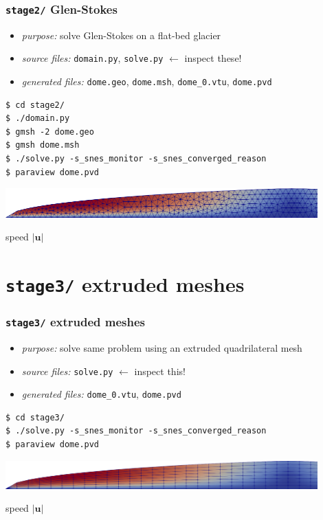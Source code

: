 \documentclass[10pt,
               hyperref={colorlinks,citecolor=DeepPink4,linkcolor=black,urlcolor=blue},
               svgnames]{beamer}
\newcommand{\bu}{\mathbf{u}}
\begin{document}
\begin{frame}[fragile]
\frametitle{\texttt{stage2/} \qquad Glen-Stokes}

\begin{itemize}
\item \emph{purpose:} solve Glen-Stokes on a flat-bed glacier
\item \emph{source files:} \texttt{domain.py}, \texttt{solve.py} \hfill \alert{$\gets$ inspect these!}
\item \emph{generated files:} \texttt{dome.geo}, \texttt{dome.msh}, \texttt{dome\_0.vtu}, \texttt{dome.pvd}
\end{itemize}

\bigskip
\begin{Verbatim}
$ cd stage2/
$ ./domain.py
$ gmsh -2 dome.geo
$ gmsh dome.msh
$ ./solve.py -s_snes_monitor -s_snes_converged_reason
$ paraview dome.pvd
\end{Verbatim}

\vspace{10mm}
\begin{center}
\includegraphics[width=0.9\textwidth]{figs/stage2.png}

{\tiny speed $|\bu|$}
\end{center}
\end{frame}


\section{\texttt{stage3/} \qquad extruded meshes}

\begin{frame}[fragile]
\frametitle{\texttt{stage3/} \qquad extruded meshes}

\begin{itemize}
\item \emph{purpose:} solve same problem using an extruded quadrilateral mesh
\item \emph{source files:} \texttt{solve.py} \hfill \alert{$\gets$ inspect this!}
\item \emph{generated files:} \texttt{dome\_0.vtu}, \texttt{dome.pvd}
\end{itemize}

\bigskip
\begin{Verbatim}
$ cd stage3/
$ ./solve.py -s_snes_monitor -s_snes_converged_reason
$ paraview dome.pvd
\end{Verbatim}

\vspace{10mm}
\begin{center}
\includegraphics[width=0.9\textwidth]{figs/stage3.png}

{\tiny speed $|\bu|$}
\end{center}
\end{frame}
\end{document}
